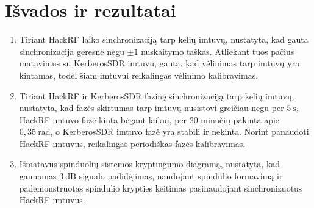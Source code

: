 \documentclass[../gnss_interference_resistant_thesis.tex]{subfiles}
\begin{document}
\section*{Išvados ir rezultatai}

\begin{enumerate}
    \item Tiriant HackRF laiko sinchronizaciją tarp kelių imtuvų, nustatyta, kad gauta sinchronizacija
          geresnė negu $\pm 1$ nuskaitymo taškas. Atliekant tuos pačius matavimus su KerberosSDR imtuvu,
          gauta, kad vėlinimas tarp imtuvų yra kintamas, todėl šiam imtuvui reikalingas vėlinimo kalibravimas.
    \item Tiriant HackRF ir KerberosSDR fazinę sinchronizaciją tarp kelių imtuvų, nustatyta, kad fazės skirtumas
          tarp imtuvų nusistovi greičiau negu per $5\ \mathrm{s}$, HackRF imtuvo fazė kinta bėgant laikui, per
          20 minučių pakinta apie $0,35\ \mathrm{rad}$, o KerberosSDR imtuvo fazė yra stabili ir nekinta.
          Norint panaudoti HackRF imtuvus, reikalingas periodiškas fazės kalibravimas.
    \item Išmatavus spinduolių sistemos kryptingumo diagramą, nustatyta, kad gaunamas $3\ \mathrm{dB}$
          signalo padidėjimas, naudojant spindulio formavimą ir pademonstruotas spindulio krypties keitimas
          pasinaudojant sinchronizuotus HackRF imtuvus.
\end{enumerate}
\end{document}
